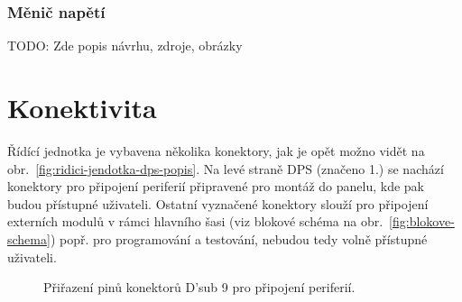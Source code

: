         \subsubsection{Měnič napětí}
            TODO: Zde popis návrhu, zdroje, obrázky

   

    \section{Konektivita}
        Řídící jednotka je vybavena několika konektory, jak je opět možno vidět na obr.~\ref{fig:ridici-jendotka-dps-popis}. Na levé straně DPS (značeno 1.) se nachází konektory pro připojení periferií připravené pro montáž do panelu, kde pak budou přístupné uživateli. Ostatní vyznačené konektory slouží pro připojení externích modulů v rámci hlavního šasi (viz blokové schéma na obr.~\ref{fig:blokove-schema}) popř. pro programování a testování, nebudou tedy volně přístupné uživateli.

        \begin{figure}[h!]
            \centering
            \caption{Přiřazení pinů konektorů D'sub 9 pro připojení periferií.}
            \label{fig:ridici-jednotka-dsub-pinout}
        \end{figure}

